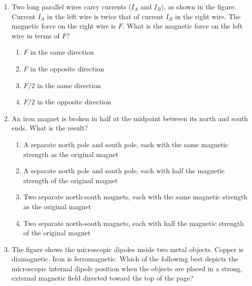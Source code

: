 \documentclass{../../oss-apphys}
\begin{document}
\begin{multicols}{2}
\begin{enumerate}[leftmargin=18pt,resume]

  \item Two long parallel wires carry currents ($I_A$ and $I_B$), as shown in
    the figure. Current $I_A$ in the left wire is twice that of current $I_B$
    in the right wire. The magnetic force on the right wire is $F$. What is the
    magnetic force on the left wire in terms of $F$?
    \begin{center}
    \end{center}
    \begin{enumerate}[noitemsep,topsep=0pt,leftmargin=18pt,label=(\Alph*)]
    \item $F$ in the same direction
    \item $F$ in the opposite direction
    \item $F/2$ in the same direction
    \item $F/2$ in the opposite direction
    \end{enumerate}


  \item An iron magnet is broken in half at the midpoint between its north
    and south ends. What is the result?
    \begin{enumerate}[noitemsep,topsep=0pt,leftmargin=18pt,label=(\Alph*)]
    \item A separate north pole and south pole, each with the same magnetic
      strength as the original magnet
    \item A separate north pole and south pole, each with half the magnetic
      strength of the original magnet
    \item Two separate north-south magnets, each with the same magnetic strength
      as the original magnet
    \item Two separate north-south magnets, each with half the magnetic strength
      of the original magnet
    \end{enumerate}

  \item The figure shows the microscopic dipoles inside two metal objects.
    Copper is diamagnetic. Iron is ferromagnetic. Which of the following best
    depicts the microscopic internal dipole position when the objects are
    placed in a strong, external magnetic field directed toward the top of the
    page?
  

\end{enumerate}
\end{multicols}
\end{document}
